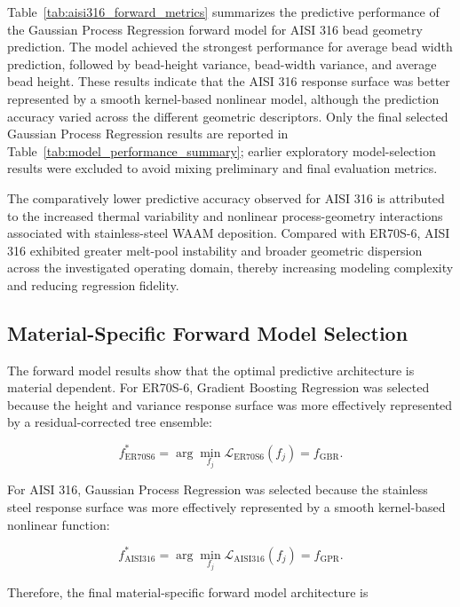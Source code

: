 \documentclass[11pt]{article}
\begin{document}
Table~\ref{tab:aisi316_forward_metrics} summarizes the predictive performance of the Gaussian Process Regression forward model for AISI 316 bead geometry prediction. The model achieved the strongest performance for average bead width prediction, followed by bead-height variance, bead-width variance, and average bead height. These results indicate that the AISI 316 response surface was better represented by a smooth kernel-based nonlinear model, although the prediction accuracy varied across the different geometric descriptors.
Only the final selected Gaussian Process Regression results are reported in Table~\ref{tab:model_performance_summary}; earlier exploratory model-selection results were excluded to avoid mixing preliminary and final evaluation metrics.

The comparatively lower predictive accuracy observed for AISI 316 is attributed to the increased thermal variability and nonlinear process-geometry interactions associated with stainless-steel WAAM deposition. Compared with ER70S-6, AISI 316 exhibited greater melt-pool instability and broader geometric dispersion across the investigated operating domain, thereby increasing modeling complexity and reducing regression fidelity.

\subsection{Material-Specific Forward Model Selection}

The forward model results show that the optimal predictive architecture is material dependent. For ER70S-6, Gradient Boosting Regression was selected because the height and variance response surface was more effectively represented by a residual-corrected tree ensemble:

\begin{equation}
f_{\mathrm{ER70S6}}^{*}
=
\arg\min_{f_j}
\mathcal{L}_{\mathrm{ER70S6}}(f_j)
=
f_{\mathrm{GBR}}.
\end{equation}

For AISI 316, Gaussian Process Regression was selected because the stainless steel response surface was more effectively represented by a smooth kernel-based nonlinear function:

\begin{equation}
f_{\mathrm{AISI316}}^{*}
=
\arg\min_{f_j}
\mathcal{L}_{\mathrm{AISI316}}(f_j)
=
f_{\mathrm{GPR}}.
\end{equation}

Therefore, the final material-specific forward model architecture is
\end{document}
